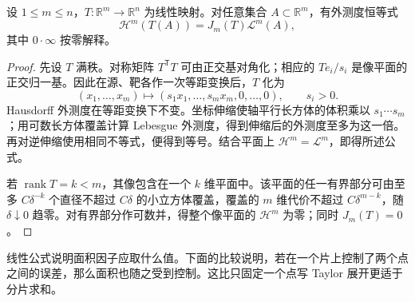 \begin{lemma}\label{g3:lem:linear-area-formula}
	设 \(1\le m\le n\)，\(T:\mathbb R^m\to\mathbb R^n\) 为线性映射。对任意集合 \(A\subset\mathbb R^m\)，有外测度恒等式
	\begin{equation}\label{g3:eq:linear-area-formula}
		\mathcal H^m(T(A))=J_m(T)\mathcal L^m(A),
	\end{equation}
	其中 \(0\cdot\infty\) 按零解释。
\end{lemma}
\begin{proof}
	先设 \(T\) 满秩。对称矩阵 \(T^{\mathsf T}T\) 可由正交基对角化；相应的 \(Te_i/s_i\) 是像平面的正交归一基。因此在源、靶各作一次等距变换后，\(T\) 化为
	\[
		(x_1,\ldots,x_m)\longmapsto(s_1x_1,\ldots,s_mx_m,0,\ldots,0),\qquad s_i>0.
	\]
	Hausdorff 外测度在等距变换下不变。坐标伸缩使轴平行长方体的体积乘以 \(s_1\cdots s_m\)；用可数长方体覆盖计算 Lebesgue 外测度，得到伸缩后的外测度至多为这一倍。再对逆伸缩使用相同不等式，便得到等号。结合平面上 \(\mathcal H^m=\mathcal L^m\)，即得所述公式。

	若 \(\operatorname{rank}T=k<m\)，其像包含在一个 \(k\) 维平面中。该平面的任一有界部分可由至多 \(C\delta^{-k}\) 个直径不超过 \(C\delta\) 的小立方体覆盖，覆盖的 \(m\) 维代价不超过 \(C\delta^{m-k}\)，随 \(\delta\downarrow0\) 趋零。对有界部分作可数并，得整个像平面的 \(\mathcal H^m\) 为零；同时 \(J_m(T)=0\)。
\end{proof}

线性公式说明面积因子应取什么值。下面的比较说明，若在一个片上控制了两个点之间的误差，那么面积也随之受到控制。这比只固定一个点写 Taylor 展开更适于分片求和。

